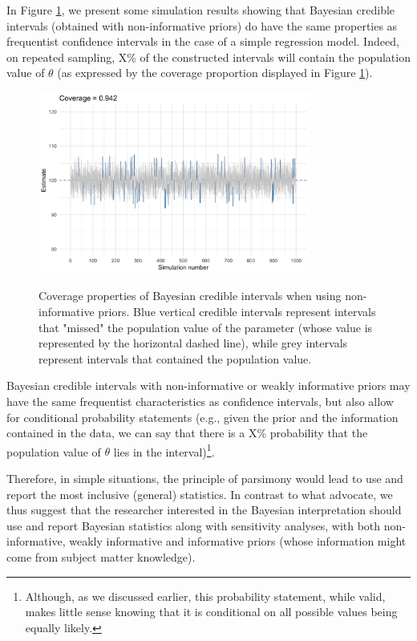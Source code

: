 \documentclass[a4paper,man,natbib,floatsintext,donotrepeattitle]{apa6}
\begin{document}
In Figure \ref{fig:coverage}, we present some simulation results showing that Bayesian credible intervals (obtained with non-informative priors) do have the same properties as frequentist confidence intervals in the case of a simple regression model. Indeed, on repeated sampling, X\% of the constructed intervals will contain the population value of $\theta$ (as expressed by the coverage proportion displayed in Figure \ref{fig:coverage}).

\begin{figure}[H]
  \caption{Coverage properties of Bayesian credible intervals when using non-informative priors. Blue vertical credible intervals represent intervals that "missed" the population value of the parameter (whose value is represented by the horizontal dashed line), while grey intervals represent intervals that contained the population value.}
  \centering
  \includegraphics[width=0.8\textwidth]{coverage1.png}
  \label{fig:coverage}
\end{figure}

Bayesian credible intervals with non-informative or weakly informative priors may have the same frequentist characteristics as confidence intervals, but also allow for conditional probability statements (e.g., given the prior and the information contained in the data, we can say that there is a X\% probability that the population value of $\theta$ lies in the interval)\footnote{Although, as we discussed earlier, this probability statement, while valid, makes little sense knowing that it is conditional on all possible values being equally likely.}.

Therefore, in simple situations, the principle of parsimony would lead to use and report the most inclusive (general) statistics. In contrast to what \cite{albers_credible_2018} advocate, we thus suggest that the researcher interested in the Bayesian interpretation should use and report Bayesian statistics along with sensitivity analyses, with both non-informative, weakly informative and informative priors (whose information might come from subject matter knowledge).
\end{document}
